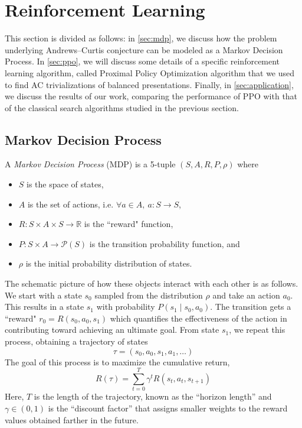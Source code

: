 
\section{Reinforcement Learning}\label{sec:rl}


This section is divided as follows: in \autoref{sec:mdp}, we discuss how the problem underlying Andrews--Curtis conjecture can be modeled as a Markov Decision Process.
In \autoref{sec:ppo}, we will discuss some details of a specific reinforcement learning algorithm, called Proximal Policy Optimization algorithm that we used to find AC trivializations of balanced presentations.
Finally, in \autoref{sec:application}, we discuss the results of our work, comparing the performance of PPO with that of the classical search algorithms studied in the previous section.

\subsection{Markov Decision Process} \label{sec:mdp}

A \textit{Markov Decision Process} (MDP) is a 5-tuple $(S, A, R, P, \rho)$ where
\begin{itemize}
	\item $S$ is the space of states,
	\item $A$ is the set of actions, i.e. $\forall a \in A, \ a \colon S \to S$,
	\item $R \colon S \times A \times S \to \mathbb{R}$ is the ``reward" function,
	\item $P \colon S \times A \to \mathcal{P}(S)$ is the transition probability function, and
	\item $\rho$ is the initial probability distribution of states.
\end{itemize}

The schematic picture of how these objects interact with each other is as follows. We start with a state $s_0$ sampled from the distribution $\rho$ and take an action $a_0$. This results in a state $s_1$ with probability $P(s_1 \mid s_0, a_0) $. The transition gets a ``reward" $r_0 = R(s_0, a_0, s_1)$ which quantifies the effectiveness of the action in contributing toward achieving an ultimate goal. From state $s_1$, we repeat this process, obtaining a trajectory of states
\[
\tau = \left( s_0, a_0, s_1, a_1, \dots \right)
\]
The goal of this process is to maximize the cumulative return,
\[
R(\tau) = \sum\limits_{t=0}^{T} \gamma^t R(s_t, a_t, s_{t+1})
\]
Here, $T$ is the length of the trajectory, known as the ``horizon length'' and $\gamma \in \left(0, 1 \right)$ is the ``discount factor'' that assigns smaller weights to the reward values obtained farther in the future.

